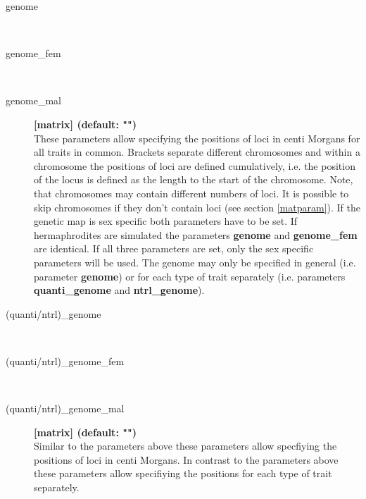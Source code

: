 \documentclass[letterpaper,12pt,oneside]{book}
\begin{document}
\begin{description}
\item[genome]\hspace*{\fill}\\
\vspace{-9mm}
\item[genome\_fem]\hspace*{\fill}\\
\vspace{-9mm}
\item[genome\_mal]\textbf{[matrix] (default: "")}\\
These parameters allow specifying the positions of loci in centi Morgans for all traits in common.
Brackets separate different chromosomes and within a chromosome the positions of  loci are defined  cumulatively, i.e. the position of the locus is defined as the length to the start of the chromosome. Note, that
chromosomes may contain different numbers of loci. It is possible to skip chromosomes if they don't
contain loci (see section \ref{matparam}). If the genetic map is sex specific both parameters have
to be set. If hermaphrodites are simulated the parameters \textbf{genome} and \textbf{genome\_fem} are identical.
If all three parameters are set, only the sex specific parameters will be used. The genome may only
be specified in general (i.e. parameter \textbf{genome}) or for each type of trait separately (i.e.
parameters \textbf{quanti\_genome} and \textbf{ntrl\_genome}).\\


\item[(quanti/ntrl)\_genome]\hspace*{\fill}\\
\vspace{-9mm}
\item[(quanti/ntrl)\_genome\_fem]\hspace*{\fill}\\
\vspace{-9mm}
\item[(quanti/ntrl)\_genome\_mal]\textbf{[matrix] (default: "")}\\
Similar to the parameters above these parameters allow specfiying the positions of loci in centi
Morgans. In contrast to the parameters above these parameters allow specifiying the positions for
each type of trait separately.\\


\end{description}
\end{document}
